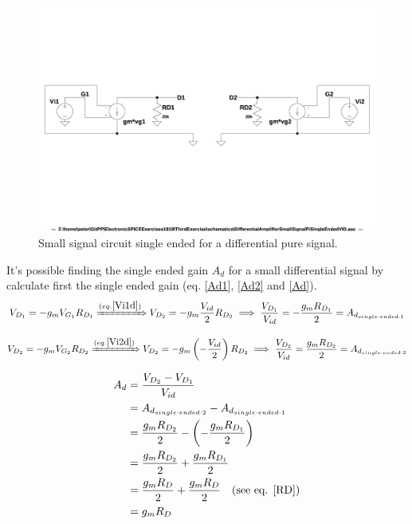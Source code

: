 \begin{figure}[h]
  \centering
  \includegraphics[width=12cm]{schematics/DifferentialAmplifier/SmallSignalPiSingleEndedVID.jpg}
  \caption{Small signal circuit single ended for a differential pure signal.}
  \label{PiSingle2}
\end{figure}

It's possible finding the single ended gain $A_d$ for a small differential signal by calculate first the single ended gain (eq. \ref{Ad1}, \ref{Ad2} and \ref{Ad}).\\

\begin{align}
V_{D_1} = - g_m V_{G_1} R_{D_1} \xRightarrow{(eq. \ref{Vi1d})}
V_{D_2} = - g_m \frac{V_{id}}{2} R_{D_2} \implies
\frac{V_{D_1}}{V_{id}} = - \frac{g_m R_{D_1}}{2} = A_{d_{single\cdot ended\cdot 1}}\label{Ad1}
\end{align}

\begin{align}
V_{D_2} = - g_m V_{G_2} R_{D_2} \xRightarrow{(eq. \ref{Vi2d})}
V_{D_2} = - g_m \left(-\frac{V_{id}}{2}\right) R_{D_2} \implies
\frac{V_{D_2}}{V_{id}} = \frac{g_m R_{D_2}}{2} = A_{d_{single\cdot ended\cdot 2}}\label{Ad2}
\end{align}

\begin{align}
A_d &= \frac{V_{D_2} - V_{D_1}}{V_{id}}\\
&= A_{d_{single\cdot ended\cdot 2}} - A_{d_{single\cdot ended\cdot 1}}\\
&= \frac{g_m R_{D_2}}{2} - \left(- \frac{g_m R_{D_1}}{2} \right)\\
&= \frac{g_m R_{D_2}}{2} + \frac{g_m R_{D_1}}{2}\\
&= \frac{g_m R_{D}}{2} + \frac{g_m R_{D}}{2} \quad \text{(see eq. \ref{RD})}\\
&= g_m R_{D} \label{Ad}
\end{align}

